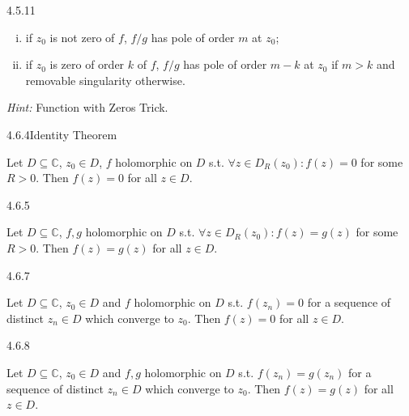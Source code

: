 \documentclass[10pt,landscape]{article}
\newcommand{\Hint}{\textit{Hint: }}
\begin{document}
\begin{multicols}{3}
\begin{lemma}{4.5.11}{}
        \begin{enumerate}[(i)]
            \setlength{\parskip}{0em}
            \item if $z_0$ is not zero of $f$, $f/g$ has pole of order $m$ at $z_0$;
            \item if $z_0$ is zero of order $k$ of $f$, $f/g$ has pole of order $m - k$ at $z_0$ if $m > k$ and removable singularity otherwise.
        \end{enumerate}

    \Hint Function with Zeros Trick.

\end{lemma}

\begin{theorem}{4.6.4}{Identity Theorem}

    Let $D \subseteq \mathbb{C}$, $z_0 \in D$, $f$ holomorphic on $D$ s.t. $\forall z \in D_R(z_0): f(z) = 0$ for some $R > 0$. Then $f(z) = 0$ for all $z \in D$.

\end{theorem}

\begin{corollary}{4.6.5}{}

    Let $D \subseteq \mathbb{C}$, $f,g$ holomorphic on $D$ s.t. $\forall z \in D_R(z_0): f(z) = g(z)$ for some $R > 0$. Then $f(z) = g(z)$ for all $z \in D$.

\end{corollary}

\begin{corollary}{4.6.7}{}

    Let $D \subseteq \mathbb{C}$, $z_0 \in D$ and $f$ holomorphic on $D$ s.t. $f(z_n) = 0$ for a sequence of distinct $z_n \in D$ which converge to $z_0$. Then $f(z) = 0$ for all $z \in D$.

\end{corollary}

\begin{corollary}{4.6.8}{}

    Let $D \subseteq \mathbb{C}$, $z_0 \in D$ and $f,g$ holomorphic on $D$ s.t. $f(z_n) = g(z_n)$ for a sequence of distinct $z_n \in D$ which converge to $z_0$. Then $f(z) = g(z)$ for all $z \in D$.

\end{corollary}


\end{multicols}
\end{document}
